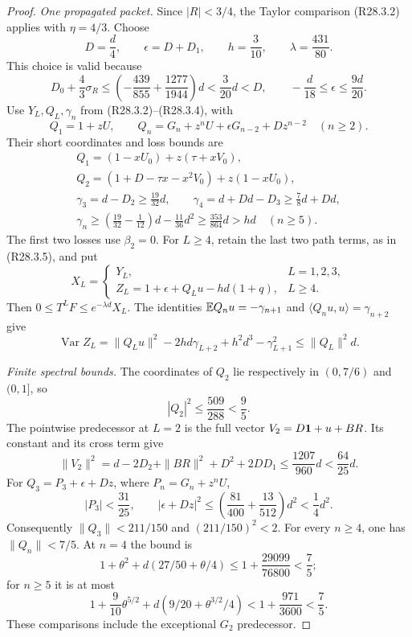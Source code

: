 \begin{proof}
\emph{One propagated packet.}
Since \(|R|<3/4\), the Taylor comparison (R28.3.2) applies
with \(\eta=4/3\). Choose
\[
 D=\frac d4,\qquad \epsilon=D+D_1,\qquad h=\frac3{10},
 \qquad \lambda=\frac{431}{80}.
\]
This choice is valid because
\[
 D_0+\frac43\sigma_R
 \le\left(-\frac{439}{855}+\frac{1277}{1944}\right)d
 <\frac3{20}d<D,\qquad
 -\frac d{18}\le\epsilon\le\frac{9d}{20}.
\]
Use \(Y_L,Q_L,\gamma_n\) from (R28.3.2)--(R28.3.4), with
\[
 Q_1=1+zU,\qquad
 Q_n=G_n+z^nU+\epsilon G_{n-2}+Dz^{n-2}\quad(n\ge2).
\]
Their short coordinates and loss bounds are
\begin{equation}\label{eq:R28:global-mask-propagation}
 \begin{gathered}
 Q_1=(1-xU_0)+z(\tau+xV_0),\\
 Q_2=(1+D-\tau x-x^2V_0)+z(1-xU_0),\\
 \gamma_3=d-D_2\ge\frac{19}{32}d,\qquad
 \gamma_4=d+Dd-D_3\ge\frac78d+Dd,\\
 \gamma_n\ge
 \left(\frac{19}{32}-\frac1{12}\right)d-\frac{11}{36}d^2
 \ge\frac{353}{864}d>hd\quad(n\ge5).
 \end{gathered}
\end{equation}
The first two losses use \(\beta_2=0\).
For \(L\ge4\), retain the last two path terms, as in
(R28.3.5), and put
\[
 X_L=
 \begin{cases}
 Y_L,&L=1,2,3,\\
 Z_L=1+\epsilon+Q_Lu-hd(1+q),&L\ge4.
 \end{cases}
\]
Then \(0\le T^LF\le e^{-\lambda d}X_L\).
The identities
\(\mathbb E Q_nu=-\gamma_{n+1}\) and
\(\langle Q_nu,u\rangle=\gamma_{n+2}\) give
\[
 \operatorname{Var}Z_L
 =\|Q_Lu\|^2-2hd\gamma_{L+2}
   +h^2d^3-\gamma_{L+1}^2
 \le\|Q_L\|^2d.
\]

\emph{Finite spectral bounds.}
The coordinates of \(Q_2\) lie respectively in
\((0,7/6)\) and \((0,1]\), so
\[
 |Q_2|^2\le\frac{509}{288}<\frac95.
\]
The pointwise predecessor at \(L=2\) is the full vector
\(V_2=D\mathbf1+u+BR\). Its constant and its cross term give
\[
 \|V_2\|^2
 =d-2D_2+\|BR\|^2+D^2+2DD_1
 \le\frac{1207}{960}d<\frac{64}{25}d.
\]
For \(Q_3=P_3+\epsilon+Dz\), where \(P_n=G_n+z^nU\),
\[
 |P_3|<\frac{31}{25},\qquad
 |\epsilon+Dz|^2
 \le\left(\frac{81}{400}+\frac{13}{512}\right)d^2
 <\frac14d^2.
\]
Consequently \(\|Q_3\|<211/150\) and
\((211/150)^2<2\). For every \(n\ge4\), one has
\(\|Q_n\|<7/5\). At \(n=4\) the bound is
\[
 1+\theta^2+d(27/50+\theta/4)
 \le1+\frac{29099}{76800}<\frac75;
\]
for \(n\ge5\) it is at most
\[
 1+\frac9{10}\theta^{5/2}
       +d(9/20+\theta^{3/2}/4)
 <1+\frac{971}{3600}<\frac75.
\]
These comparisons include the exceptional \(G_2\) predecessor.


\end{proof}
